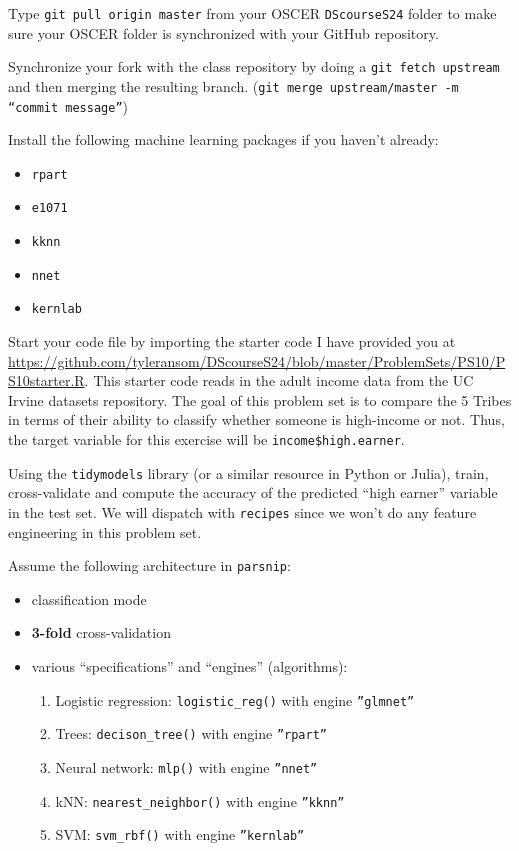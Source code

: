 \documentclass[12pt,english]{exam}
\begin{document}
\begin{questions}
\question Type \texttt{git pull origin master} from your OSCER \texttt{DScourseS24} folder to make sure your OSCER folder is synchronized with your GitHub repository. 

\question Synchronize your fork with the class repository by doing a \texttt{git fetch upstream} and then merging the resulting branch. (\texttt{git merge upstream/master -m ``commit message''})

\question Install the following machine learning packages if you haven't already:
\begin{itemize}
    \item \texttt{rpart}
    \item \texttt{e1071}
    \item \texttt{kknn}
    \item \texttt{nnet}
    \item \texttt{kernlab}
\end{itemize}

\question Start your code file by importing the starter code I have provided you at \url{https://github.com/tyleransom/DScourseS24/blob/master/ProblemSets/PS10/PS10starter.R}. This starter code reads in the adult income data from the UC Irvine datasets repository. The goal of this problem set is to compare the 5 Tribes in terms of their ability to classify whether someone is high-income or not. Thus, the target variable for this exercise will be \texttt{income\$high.earner}. 

\question Using the \texttt{tidymodels} library (or a similar resource in Python or Julia), train, cross-validate and compute the accuracy of the predicted ``high earner'' variable in the test set. We will dispatch with \texttt{recipes} since we won't do any feature engineering in this problem set.

Assume the following architecture in \texttt{parsnip}:

\begin{itemize}
\item classification mode
\item \textbf{3-fold} cross-validation
\item various ``specifications'' and ``engines'' (algorithms):
    \begin{enumerate}
    \item Logistic regression: \texttt{logistic\_reg()} with engine \texttt{''glmnet''}    
    \item Trees: \texttt{decison\_tree()} with engine \texttt{''rpart''}
    \item Neural network: \texttt{mlp()} with engine \texttt{''nnet''}      
    \item kNN: \texttt{nearest\_neighbor()} with engine \texttt{''kknn''}       
    \item SVM: \texttt{svm\_rbf()} with engine \texttt{''kernlab''}       
    \end{enumerate}
\end{itemize}


\end{questions}
\end{document}
